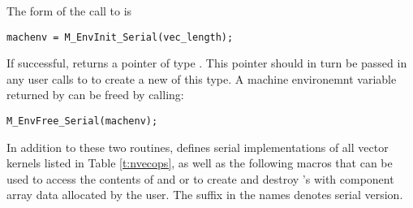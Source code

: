 \noindent The form of the call to  is
\begin{verbatim}
machenv = M_EnvInit_Serial(vec_length);
\end{verbatim}
If successful,  returns a pointer of type
. This pointer should in turn be passed in any user
calls to  to create a new  of this type.
A machine environemnt variable  returned by 
can be freed by calling:
\begin{verbatim}
M_EnvFree_Serial(machenv);
\end{verbatim}
In addition to these two routines, {\nvecs} defines serial implementations of all 
vector kernels listed in Table \ref{t:nvecops}, as well as the following macros
that can be used to access the contents of  and 
or to create and destroy 's with component array data allocated
by the user. The suffix  in the names denotes serial version.
